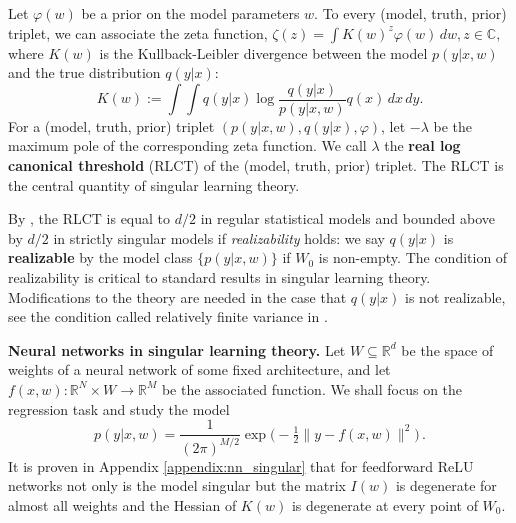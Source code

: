 \documentclass{article} %
\def\lto{\longrightarrow}
\begin{document}
Let  $\varphi(w)$ be a prior on the model parameters $w$.
To every (model, truth, prior) triplet, we can associate the zeta function,
$
\zeta(z) = \int K(w)^z \varphi(w) \,dw, z \in \mathbb C,
$
where $K(w)$ is the Kullback-Leibler divergence between the model $p(y|x,w)$ and the true distribution $q(y|x)$:
\begin{equation}
    K(w) := \int \!\int q(y|x) \log \frac{ q(y|x) }{ p(y|x,w) } q(x) \,dx \,dy.
\label{eq:KL}
\end{equation}
For a (model, truth, prior) triplet $(p(y|x,w),q(y|x),\varphi)$, let $-\lambda$ be the maximum pole of the corresponding zeta function. We call $\lambda$ the \textbf{real log canonical threshold} (RLCT) \citep{watanabe_algebraic_2009} of the (model, truth, prior) triplet. The RLCT is the central quantity of singular learning theory. 

By {\citet[Theorem 6.4]{watanabe_algebraic_2009}}, the RLCT is equal to $d/2$ in regular statistical models and bounded above by $d/2$ in strictly singular models if \textit{realizability} holds:
we say $q(y|x)$ is \textbf{realizable} by the model class $\{p(y|x,w)\}$ if $W_0$ is non-empty.
The condition of realizability is critical to standard results in singular learning theory. Modifications to the theory are needed in the case that $q(y|x)$ is not realizable, see the condition called relatively finite variance in \citet{watanabe_mathematical_2018}.

\textbf{Neural networks in singular learning theory.} Let $W \subseteq \mathbb{R}^d$ be the space of weights of a neural network of some fixed architecture, and let $f(x,w): \mathbb{R}^N \times W \lto \mathbb{R}^M$ be the associated function. We shall focus on the regression task and study the model
\begin{equation}
p(y|x,w) = \frac{1}{(2 \pi)^{M/2}} \exp\Big(-\tfrac{1}{2} \| y - f(x,w) \|^2 \Big)\,.
\label{eq:gaussian_model_in_w}
\end{equation}
It is proven in Appendix \ref{appendix:nn_singular} that for feedforward ReLU networks not only is the model singular but the matrix $I(w)$ is degenerate for almost all weights and the Hessian of $K(w)$ is degenerate at every point of $W_0$.
\end{document}
